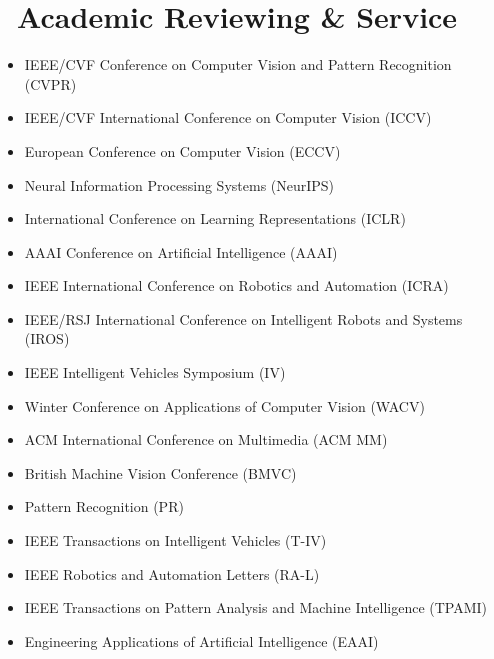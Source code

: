 \documentclass[a4paper,11pt]{article}
\begin{document}
\section{\faCheckCircle\ Academic Reviewing \& Service}
\begin{itemize}[leftmargin=0.35cm]

    \item IEEE/CVF Conference on Computer Vision and Pattern Recognition (CVPR)
    \item IEEE/CVF International Conference on Computer Vision (ICCV)
    \item European Conference on Computer Vision (ECCV)
    \item Neural Information Processing Systems (NeurIPS)
    \item International Conference on Learning Representations (ICLR)
    \item AAAI Conference on Artificial Intelligence (AAAI)
    \item IEEE International Conference on Robotics and Automation (ICRA)
    \item IEEE/RSJ International Conference on Intelligent Robots and Systems (IROS)
    \item IEEE Intelligent Vehicles Symposium (IV)
    \item Winter Conference on Applications of Computer Vision (WACV)
    \item ACM International Conference on Multimedia (ACM MM)
    \item British Machine Vision Conference (BMVC)
    \item Pattern Recognition (PR)
    \item IEEE Transactions on Intelligent Vehicles (T-IV)
    \item IEEE Robotics and Automation Letters (RA-L)
    \item IEEE Transactions on Pattern Analysis and Machine Intelligence (TPAMI)
    \item Engineering Applications of Artificial Intelligence (EAAI)

\end{itemize}

\end{document}
